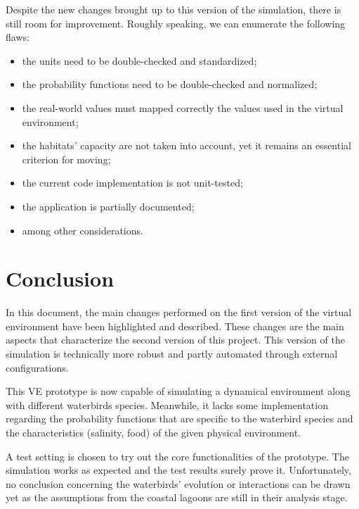 Despite the new changes brought up to this version of the simulation, there is still room for improvement. Roughly speaking, we can enumerate the following flaws:
\begin{itemize}
    \item the units need to be double-checked and standardized;
    \item the probability functions need to be double-checked and normalized;
    \item the real-world values must mapped correctly the values used in the virtual environment;
    \item the habitats' capacity are not taken into account, yet it remains an essential criterion for moving;
    \item the current code implementation is not unit-tested;
    \item the application is partially documented;
    \item among other considerations.
\end{itemize}

\clearpage
\newpage
\section{Conclusion}
In this document, the main changes performed on the first version of the virtual environment have been highlighted and described. These changes are the main aspects that characterize the second version of this project. This version of the simulation is technically more robust and partly automated through external configurations.

This VE prototype is now capable of simulating a dynamical environment along with different waterbirds species. Meanwhile, it lacks some implementation regarding the probability functions that are specific to the waterbird species and the characteristics (salinity, food) of the given physical environment.

A test setting is chosen to try out the core functionalities of the prototype. The simulation works as expected and the test results surely prove it. Unfortunately, no conclusion concerning the waterbirds' evolution or interactions can be drawn yet as the assumptions from the coastal lagoons are still in their analysis stage.
